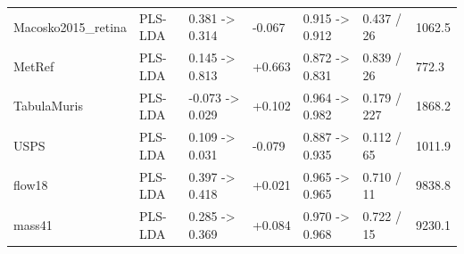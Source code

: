 \documentclass[twoside,11pt]{article}
\begin{document}
\begin{small}
\begin{table}[p]
{\begin{tabular}{lllllll}
Macosko2015\_retina & PLS-LDA & 0.381 -\textgreater{} 0.314 & -0.067 & 0.915 -\textgreater{} 0.912 & 0.437 / 26 & 1062.5 \\
MetRef & PLS-LDA & 0.145 -\textgreater{} 0.813 & +0.663 & 0.872 -\textgreater{} 0.831 & 0.839 / 26 & 772.3 \\
TabulaMuris & PLS-LDA & -0.073 -\textgreater{} 0.029 & +0.102 & 0.964 -\textgreater{} 0.982 & 0.179 / 227 & 1868.2 \\
USPS & PLS-LDA & 0.109 -\textgreater{} 0.031 & -0.079 & 0.887 -\textgreater{} 0.935 & 0.112 / 65 & 1011.9 \\
flow18 & PLS-LDA & 0.397 -\textgreater{} 0.418 & +0.021 & 0.965 -\textgreater{} 0.965 & 0.710 / 11 & 9838.8 \\
mass41 & PLS-LDA & 0.285 -\textgreater{} 0.369 & +0.084 & 0.970 -\textgreater{} 0.968 & 0.722 / 15 & 9230.1 \\
\bottomrule
\end{tabular}%
}
\end{table}


\end{small}
\end{document}

